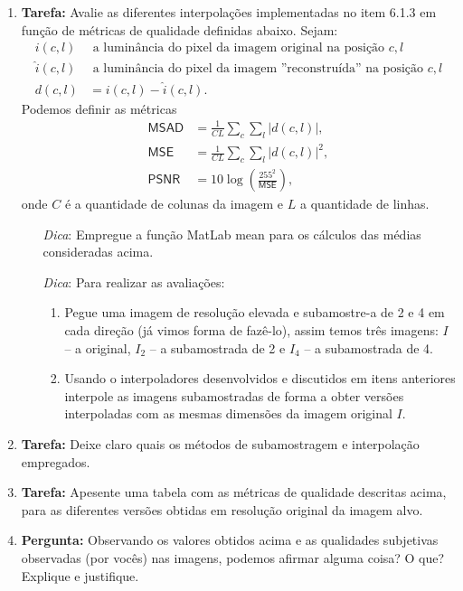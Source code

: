 \documentclass[11pt]{article}
\begin{document}
\begin{enumerate}

\item \textbf{Tarefa:} Avalie as diferentes interpolações implementadas no item 6.1.3 em função de métricas de qualidade definidas abaixo. Sejam:
\begin{align}
i(c,l) & \textrm{ a luminância do pixel da imagem original na posição } c,l \\
\hat{i}(c,l) & \textrm{ a luminância do pixel da imagem ''reconstruída'' na posição } c,l \\
d(c,l) & = i(c,l) - \hat{i}(c,l).
\end{align}
Podemos definir as métricas
\begin{align}
\textsf{MSAD} & = \frac{1}{CL}\sum_c{\sum_l{ \left | d(c,l) \right |  }}, \\
\textsf{MSE} & = \frac{1}{CL}\sum_c{\sum_l{ \left | d(c,l) \right |^2  }}, \\
\textsf{PSNR} & = 10 \log{\left ( \frac{255^2}{\textsf{MSE}} \right )}, 
\end{align}
onde $C$ é a quantidade de colunas da imagem e $L$ a quantidade de linhas.

\begin{itemize}
\item[\textit{Dica}:] Empregue a função \textsf{MatLab} \textsf{mean} para os cálculos das médias consideradas acima. 

\item[\textit{Dica}:] Para realizar as avaliações:
\begin{enumerate}
\item Pegue uma imagem de resolução elevada e subamostre-a de 2 e 4 em cada direção (já vimos forma de fazê-lo), assim temos três imagens: $I$ -- a original, $I_2$ -- a subamostrada de 2 e $I_4$  -- a subamostrada de 4. 
\item Usando o interpoladores desenvolvidos e discutidos em itens anteriores interpole as imagens subamostradas de forma a obter versões interpoladas com as mesmas dimensões da imagem original $I$.
\end{enumerate}
\end{itemize}

\item \textbf{Tarefa:} Deixe claro quais os métodos de subamostragem e interpolação empregados.

\item \textbf{Tarefa:} Apesente uma tabela com as métricas de qualidade descritas acima, para as diferentes versões obtidas em resolução original da imagem alvo. 

\item \textbf{Pergunta:} Observando os valores obtidos acima e as qualidades subjetivas observadas (por vocês) nas imagens, podemos afirmar alguma coisa? O que? Explique e justifique.

\end{enumerate}
\end{document}
